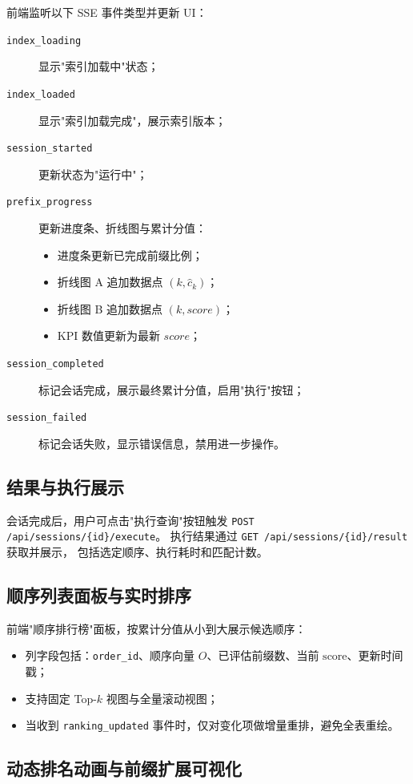\documentclass[12pt,a4paper]{article}
\begin{document}
前端监听以下 SSE 事件类型并更新 UI：
\begin{description}
  \item[\texttt{index\_loading}] 显示"索引加载中"状态；
  \item[\texttt{index\_loaded}] 显示"索引加载完成"，展示索引版本；
  \item[\texttt{session\_started}] 更新状态为"运行中"；
  \item[\texttt{prefix\_progress}] 更新进度条、折线图与累计分值：
    \begin{itemize}
      \item 进度条更新已完成前缀比例；
      \item 折线图 A 追加数据点 $(k, \hat{c}_k)$；
      \item 折线图 B 追加数据点 $(k, \mathit{score})$；
      \item KPI 数值更新为最新 $\mathit{score}$；
    \end{itemize}
  \item[\texttt{session\_completed}] 标记会话完成，展示最终累计分值，启用"执行"按钮；
  \item[\texttt{session\_failed}] 标记会话失败，显示错误信息，禁用进一步操作。
\end{description}

\subsection{结果与执行展示}

会话完成后，用户可点击"执行查询"按钮触发 \texttt{POST /api/sessions/\{id\}/execute}。
执行结果通过 \texttt{GET /api/sessions/\{id\}/result} 获取并展示，
包括选定顺序、执行耗时和匹配计数。

\subsection{顺序列表面板与实时排序}

前端"顺序排行榜"面板，按累计分值从小到大展示候选顺序：
\begin{itemize}
  \item 列字段包括：\texttt{order\_id}、顺序向量 $O$、已评估前缀数、当前 $\mathrm{score}$、更新时间戳；
  \item 支持固定 Top-$k$ 视图与全量滚动视图；
  \item 当收到 \texttt{ranking\_updated} 事件时，仅对变化项做增量重排，避免全表重绘。
\end{itemize}

\subsection{动态排名动画与前缀扩展可视化}
\end{document}
